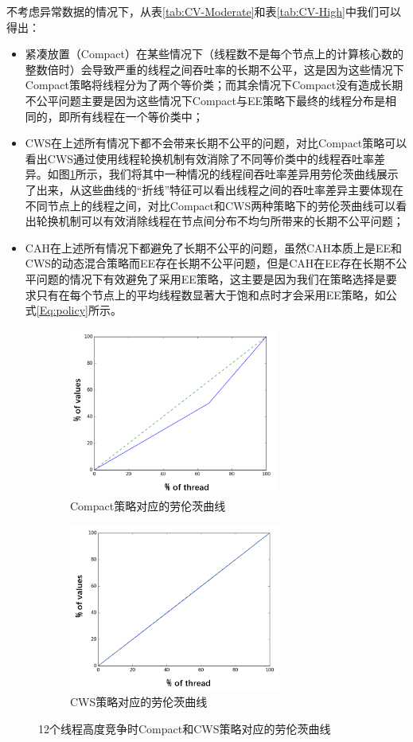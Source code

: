 不考虑异常数据的情况下，从表\ref{tab:CV-Moderate}和表\ref{tab:CV-High}中我们可以得出：
\begin{itemize}
\item 紧凑放置（Compact）在某些情况下（线程数不是每个节点上的计算核心数的整数倍时）会导致严重的线程之间吞吐率的长期不公平，这是因为这些情况下Compact策略将线程分为了两个等价类；而其余情况下Compact没有造成长期不公平问题主要是因为这些情况下Compact与EE策略下最终的线程分布是相同的，即所有线程在一个等价类中；
\item CWS在上述所有情况下都不会带来长期不公平的问题，对比Compact策略可以看出CWS通过使用线程轮换机制有效消除了不同等价类中的线程吞吐率差异。如图\ref{fig:high-12}所示，我们将其中一种情况的线程间吞吐率差异用劳伦茨曲线展示了出来，从这些曲线的“折线”特征可以看出线程之间的吞吐率差异主要体现在不同节点上的线程之间，对比Compact和CWS两种策略下的劳伦茨曲线可以看出轮换机制可以有效消除线程在节点间分布不均匀所带来的长期不公平问题；
\item CAH在上述所有情况下都避免了长期不公平的问题，虽然CAH本质上是EE和CWS的动态混合策略而EE存在长期不公平问题，但是CAH在EE存在长期不公平问题的情况下有效避免了采用EE策略，这主要是因为我们在策略选择是要求只有在每个节点上的平均线程数显著大于饱和点时才会采用EE策略，如公式\ref{Eq:policy}所示。
\end{itemize}

\begin{figure}[!htp]
  \centering
  \begin{subfigure}{8.0cm}
    \centering
    \includegraphics[height=5.5cm]{figure/compact-high-12.png}
    \caption{Compact策略对应的劳伦茨曲线}
  \end{subfigure}
  \hspace{1em}
  \begin{subfigure}{6.0cm}
    \centering
    \includegraphics[height=5.5cm]{figure/CWS-high-12.PNG}
    \caption{CWS策略对应的劳伦茨曲线}
  \end{subfigure}
  \caption{12个线程高度竞争时Compact和CWS策略对应的劳伦茨曲线}
  \label{fig:high-12}
\end{figure}



